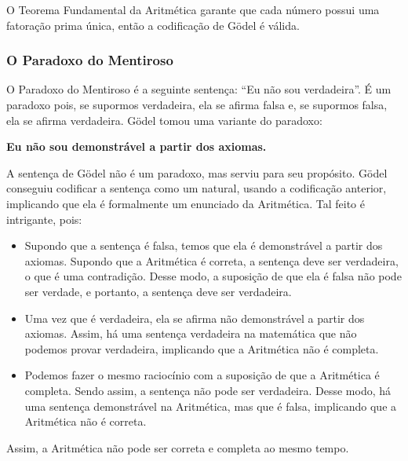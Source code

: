 O Teorema Fundamental da Aritmética garante que cada número possui uma fatoração prima única, então a codificação de Gödel é válida.

\subsubsection{O Paradoxo do Mentiroso}
O Paradoxo do Mentiroso é a seguinte sentença: ``Eu não sou verdadeira''. É um paradoxo pois, se supormos verdadeira, ela se afirma falsa e, se supormos falsa, ela se afirma verdadeira. Gödel tomou uma variante do paradoxo:
\begin{center}
    \textbf{Eu não sou demonstrável a partir dos axiomas.}
\end{center}
A sentença de Gödel não é um paradoxo, mas serviu para seu propósito. Gödel conseguiu codificar a sentença como um natural, usando a codificação anterior, implicando que ela é formalmente um enunciado da Aritmética. Tal feito é intrigante, pois:

\begin{itemize}
    \item Supondo que a sentença é falsa, temos que ela é demonstrável a partir dos axiomas. Supondo que a Aritmética é correta, a sentença deve ser verdadeira, o que é uma contradição. Desse modo, a suposição de que ela é falsa não pode ser verdade, e portanto, a sentença deve ser verdadeira.
    \item Uma vez que é verdadeira, ela se afirma não demonstrável a partir dos axiomas. Assim, há uma sentença verdadeira na matemática que não podemos provar verdadeira, implicando que a Aritmética não é completa.
    \item Podemos fazer o mesmo raciocínio com a suposição de que a Aritmética é completa. Sendo assim, a sentença não pode ser verdadeira. Desse modo, há uma sentença demonstrável na Aritmética, mas que é falsa, implicando que a Aritmética não é correta.
\end{itemize}

Assim, a Aritmética não pode ser correta e completa ao mesmo tempo.